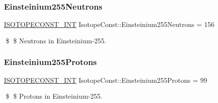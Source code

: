 \subsubsection{\texorpdfstring{Einsteinium255\+Neutrons}{Einsteinium255Neutrons}}
{\footnotesize\ttfamily \mbox{\hyperlink{group___isotope_const-_macros_ga5f18360b3e99483a35c32d789e62621c}{I\+S\+O\+T\+O\+P\+E\+C\+O\+N\+S\+T\+\_\+\+I\+NT}} Isotope\+Const\+::\+Einsteinium255\+Neutrons = 156}

\$ \$ Neutrons in Einsteinium-\/255. \mbox{\label{group___isotope_const-_einsteinium-_es255_ga73981f1dadcc4b4f8aeb67a419fc09bc}} 
\subsubsection{\texorpdfstring{Einsteinium255\+Protons}{Einsteinium255Protons}}
{\footnotesize\ttfamily \mbox{\hyperlink{group___isotope_const-_macros_ga5f18360b3e99483a35c32d789e62621c}{I\+S\+O\+T\+O\+P\+E\+C\+O\+N\+S\+T\+\_\+\+I\+NT}} Isotope\+Const\+::\+Einsteinium255\+Protons = 99}

\$ \$ Protons in Einsteinium-\/255. 